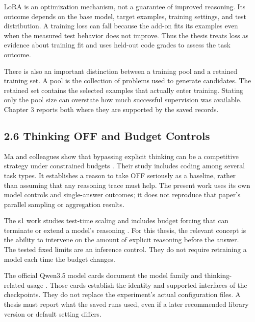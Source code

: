 \documentclass[11pt,letterpaper]{article}
\begin{document}
LoRA is an optimization mechanism, not a guarantee of improved reasoning. Its outcome depends on the base model, target examples, training settings, and test distribution. A training loss can fall because the add-on fits its examples even when the measured test behavior does not improve. Thus the thesis treats loss as evidence about training fit and uses held-out code grades to assess the task outcome.\par

There is also an important distinction between a training pool and a retained training set. A pool is the collection of problems used to generate candidates. The retained set contains the selected examples that actually enter training. Stating only the pool size can overstate how much successful supervision was available. Chapter 3 reports both where they are supported by the saved records.\par

\subsection*{2.6 Thinking OFF and Budget Controls}

Ma and colleagues show that bypassing explicit thinking can be a competitive strategy under constrained budgets \cite{nothink}. Their study includes coding among several task types. It establishes a reason to take OFF seriously as a baseline, rather than assuming that any reasoning trace must help. The present work uses its own model controls and single-answer outcomes; it does not reproduce that paper's parallel sampling or aggregation results.\par

The s1 work studies test-time scaling and includes budget forcing that can terminate or extend a model's reasoning \cite{s1}. For this thesis, the relevant concept is the ability to intervene on the amount of explicit reasoning before the answer. The tested fixed limits are an inference control. They do not require retraining a model each time the budget changes.\par

The official Qwen3.5 model cards document the model family and thinking-related usage \cite{q08,q2,q4}. Those cards establish the identity and supported interfaces of the checkpoints. They do not replace the experiment's actual configuration files. A thesis must report what the saved runs used, even if a later recommended library version or default setting differs.\par
\end{document}
